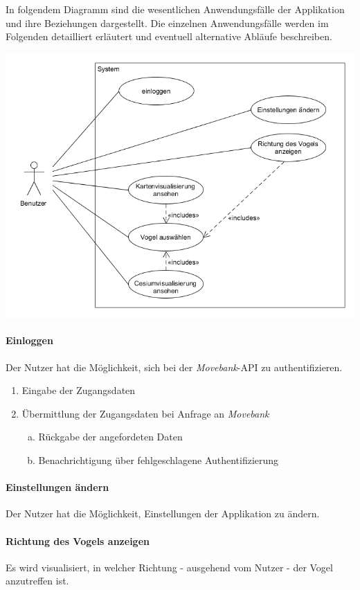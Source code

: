 \documentclass[12pt]{article} %
\newenvironment{cptenumerate}[1][label=\arabic*.]{\begin{enumerate}[#1] \setlength\itemsep{0em}}{\end{enumerate}}
\begin{document}
In folgendem Diagramm sind die wesentlichen Anwendungsfälle der Applikation und ihre Beziehungen dargestellt. Die einzelnen Anwendungsfälle werden im Folgenden detailliert erläutert und eventuell alternative Abläufe beschreiben.

\includegraphics[width = 1\linewidth]{Usecasediagramm.png}

\paragraph{Einloggen} Der Nutzer hat die Möglichkeit, sich bei der \textit{Movebank}-API zu authentifizieren.
\begin{cptenumerate} 
  	 \item Eingabe der Zugangsdaten
  	 \item Übermittlung der Zugangsdaten bei Anfrage an \textit{Movebank}
  	 \begin{cptenumerate}[a.]
  	  	 \item Rückgabe der angefordeten Daten
  	  	 \item Benachrichtigung über fehlgeschlagene Authentifizierung
  	 \end{cptenumerate} 
 \end{cptenumerate}  

 \paragraph{Einstellungen ändern} Der Nutzer hat die Möglichkeit, Einstellungen der Applikation zu ändern.

 \paragraph{Richtung des Vogels anzeigen} Es wird visualisiert, in welcher Richtung - ausgehend vom Nutzer - der Vogel anzutreffen ist.
\end{document}
